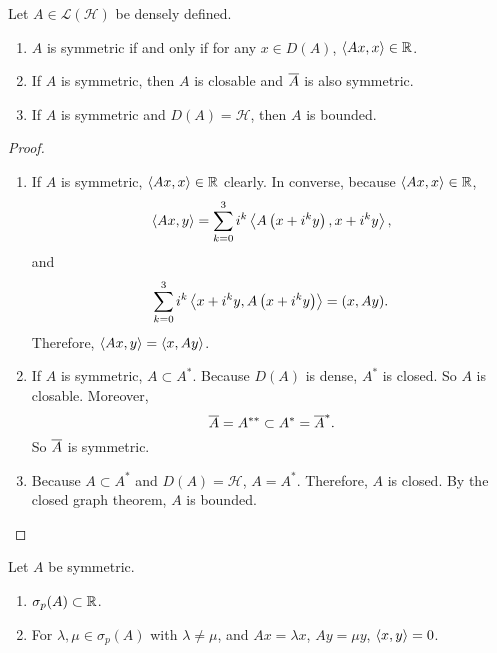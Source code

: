 \documentclass[a4paper,12pt]{article}
\begin{document}
\begin{prop}
    Let $A \in \mathcal{L}(\mathcal{H})$ be densely defined.
    \begin{enumerate}[label=(\arabic{*})]
        \item $A$ is symmetric if and only if for any $x\in D(A)$, $\left\langle Ax,x \right\rangle \in \mathbb{R}$.
        \item If $A$ is symmetric, then $A$ is closable and $\overline{A}$ is also symmetric.
        \item If $A$ is symmetric and $D(A) = \mathcal{H}$, then $A$ is bounded.
    \end{enumerate}
\end{prop}
\begin{proof}
    \begin{enumerate}[label=(\arabic{*})]
        \item If $A$ is symmetric, $\left\langle Ax,x \right\rangle \in \mathbb{R}$ clearly. In converse, because $\left\langle Ax,x \right\rangle \in \mathbb{R}$,
        \begin{equation*}
            \left\langle A x, y \right\rangle=\sum_{k=0}^3 i^k\left\langle A\left(x+i^k y\right), x+i^k y \right\rangle,
        \end{equation*}
        and
        \begin{equation*}
            \sum_{k=0}^3 i^k\left\langle x+i^k y, A\left(x+i^k y\right) \right\rangle=(x, A y).
        \end{equation*}
        Therefore, $\left\langle Ax,y \right\rangle = \left\langle x,Ay \right\rangle$. 

        \item If $A$ is symmetric, $A \subset A^*$. Because $D(A)$ is dense, $A^*$ is closed. So $A$ is closable. Moreover,
        \begin{equation*}
            \overline{A} = A^{**} \subset A^* = \overline{A}^*.
        \end{equation*}
        So $\overline{A}$ is symmetric.

        \item Because $A \subset A^*$ and $D(A) = \mathcal{H}$, $A = A^*$. Therefore, $A$ is closed. By the closed graph theorem, $A$ is bounded. \qedhere
    \end{enumerate}
\end{proof}

\begin{prop}
    Let $A$ be symmetric. 
    \begin{enumerate}[label=(\arabic{*})]
        \item $\sigma_p(A) \subset \mathbb{R}$.
        \item For $\lambda,\mu \in \sigma_p(A)$ with $\lambda \neq \mu$, and $Ax = \lambda x$, $Ay = \mu y$, $\left\langle x,y \right\rangle = 0$.
    \end{enumerate}
\end{prop}
\end{document}
